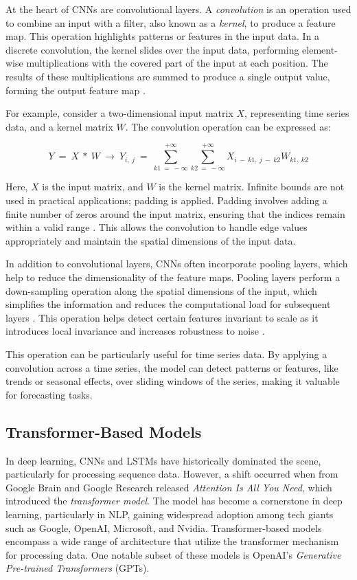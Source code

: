 \documentclass[12pt,a4paper]{article}
\begin{document}
At the heart of CNNs are convolutional layers. A \textit{convolution} is an operation used to combine an input with a filter, also known as a \textit{kernel}, to produce a feature map. This operation highlights patterns or features in the input data. In a discrete convolution, the kernel slides over the input data, performing element-wise multiplications with the covered part of the input at each position. The results of these multiplications are summed to produce a single output value, forming the output feature map \parencite{Raschka2017}.

For example, consider a two-dimensional input matrix $X$, representing time series data, and a kernel matrix $W$. The convolution operation can be expressed as:

\begin{equation}
  Y\ =\ X\ \ast\ W\ \rightarrow\ Y_{i,\ j}\ =\ \sum_{k1\ =\ -\infty}^{+\infty}\sum_{k2\ =\ -\infty}^{+\infty}{X_{i\ -\ k1,\ j\ -\ k2}W_{k1,\ k2}}
\end{equation}

Here, $X$ is the input matrix, and $W$ is the kernel matrix. Infinite bounds are not used in practical applications; padding is applied. Padding involves adding a finite number of zeros around the input matrix, ensuring that the indices remain within a valid range \parencite{Raschka2017}. This allows the convolution to handle edge values appropriately and maintain the spatial dimensions of the input data.

In addition to convolutional layers, CNNs often incorporate pooling layers, which help to reduce the dimensionality of the feature maps. Pooling layers perform a down-sampling operation along the spatial dimensions of the input, which simplifies the information and reduces the computational load for subsequent layers \parencite{Raschka2017}. This operation helps detect certain features invariant to scale as it introduces local invariance and increases robustness to noise \parencite{Raschka2017}.

This operation can be particularly useful for time series data. By applying a convolution across a time series, the model can detect patterns or features, like trends or seasonal effects, over sliding windows of the series, making it valuable for forecasting tasks.

\subsection{Transformer-Based Models}
In deep learning, CNNs and LSTMs have historically dominated the scene, particularly for processing sequence data. However, a shift occurred when \cite{Vaswani2017} from Google Brain and Google Research released \textit{Attention Is All You Need}, which introduced the \textit{transformer model}. The model has become a cornerstone in deep learning, particularly in NLP, gaining widespread adoption among tech giants such as Google, OpenAI, Microsoft, and Nvidia. Transformer-based models encompass a wide range of architecture that utilize the transformer mechanism for processing data. One notable subset of these models is OpenAI's \textit{Generative Pre-trained Transformers} (GPTs). 
\end{document}
